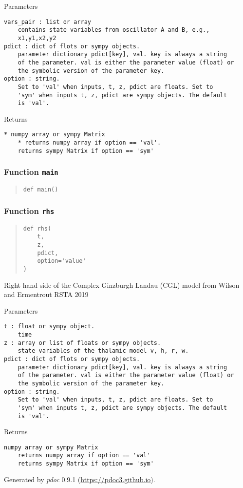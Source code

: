 \documentclass[english,a4paper,oneside]{article}
\begin{document}
Parameters

\begin{verbatim}
vars_pair : list or array
    contains state variables from oscillator A and B, e.g.,
    x1,y1,x2,y2
pdict : dict of flots or sympy objects.
    parameter dictionary pdict[key], val. key is always a string
    of the parameter. val is either the parameter value (float) or 
    the symbolic version of the parameter key.
option : string.
    Set to 'val' when inputs, t, z, pdict are floats. Set to
    'sym' when inputs t, z, pdict are sympy objects. The default
    is 'val'.
\end{verbatim}

Returns

\begin{verbatim}
* numpy array or sympy Matrix
    * returns numpy array if option == 'val'. 
    returns sympy Matrix if option == 'sym'
\end{verbatim}

\hypertarget{CGL.main}{%
\subsubsection{\texorpdfstring{Function
\texttt{main}}{Function main}}\label{CGL.main}}

\begin{quote}
\begin{verbatim}
def main()
\end{verbatim}
\end{quote}

\hypertarget{CGL.rhs}{%
\subsubsection{\texorpdfstring{Function
\texttt{rhs}}{Function rhs}}\label{CGL.rhs}}

\begin{quote}
\begin{verbatim}
def rhs(
    t,
    z,
    pdict,
    option='value'
)
\end{verbatim}
\end{quote}

Right-hand side of the Complex Ginzburgh-Landau (CGL) model from Wilson
and Ermentrout RSTA 2019

Parameters

\begin{verbatim}
t : float or sympy object.
    time
z : array or list of floats or sympy objects.
    state variables of the thalamic model v, h, r, w.
pdict : dict of flots or sympy objects.
    parameter dictionary pdict[key], val. key is always a string
    of the parameter. val is either the parameter value (float) or 
    the symbolic version of the parameter key.
option : string.
    Set to 'val' when inputs, t, z, pdict are floats. Set to
    'sym' when inputs t, z, pdict are sympy objects. The default
    is 'val'.
\end{verbatim}

Returns

\begin{verbatim}
numpy array or sympy Matrix
    returns numpy array if option == 'val'
    returns sympy Matrix if option == 'sym'
\end{verbatim}

Generated by \emph{pdoc} 0.9.1 (\url{https://pdoc3.github.io}).
\end{document}
